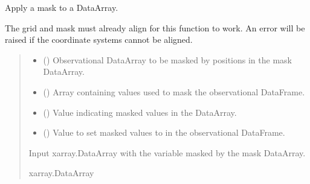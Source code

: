 \documentclass[letterpaper,10pt,english]{sphinxmanual}
\begin{document}
\begin{fulllineitems}
\end{fulllineitems}


\begin{fulllineitems}
\label{\detokenize{misc:glomar_gridding.mask.mask_array}}
\pysigstartsignatures
\pysiglinewithargsret
{}
{\sphinxparamcomma {}\sphinxparamcomma {}\sphinxparamcomma {}}
{}
\pysigstopsignatures
\sphinxAtStartPar
Apply a mask to a DataArray.

\sphinxAtStartPar
The grid and mask must already align for this function to work. An error
will be raised if the coordinate systems cannot be aligned.
\begin{quote}\begin{description}
\begin{itemize}
\item {}
\sphinxAtStartPar
{} () \textendash{} Observational DataArray to be masked by positions in the mask
DataArray.

\item {}
\sphinxAtStartPar
{} () \textendash{} Array containing values used to mask the observational DataFrame.

\item {}
\sphinxAtStartPar
{} () \textendash{} Value indicating masked values in the DataArray.

\item {}
\sphinxAtStartPar
{} () \textendash{} Value to set masked values to in the observational DataFrame.

\end{itemize}

\sphinxAtStartPar
{} \textendash{} Input xarray.DataArray with the variable masked by the mask DataArray.

\sphinxAtStartPar
xarray.DataArray

\end{description}\end{quote}

\end{fulllineitems}
\end{document}
